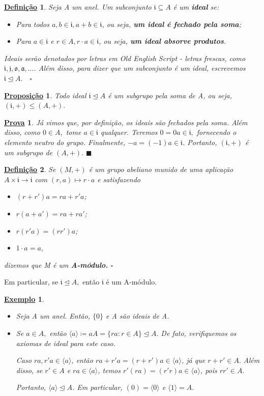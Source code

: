 \documentclass{article}
\newtheorem*{def*}{\underline{Defini\c c\~ao}}
\newtheorem*{prop*}{\underline{Proposi\c c\~ao}}
\newtheorem{example}{\underline{Exemplo}}
\newtheorem*{proof*}{\underline{Prova}}
\renewcommand\qedsymbol{$\blacksquare$}
\begin{document}
\begin{def*}
  Seja A um anel. Um subconjunto \(\mathfrak{i}\subseteq{A}\) é um \textbf{ideal} se:
  \begin{itemize}
    \item[1)] Para todos \(a, b\in \mathfrak{i}, a + b\in \mathfrak{i}\), ou seja, \textbf{um ideal é fechado pela soma};
    \item[2)] Para \(a\in \mathfrak{i}\) e \(r\in A, r \cdot a\in \mathfrak{i}\), ou seja, \textbf{um ideal absorve produtos}.
  \end{itemize}
  Ideais serão denotados por letras em \textit{Old English Script} - letras frescas, como \(\mathfrak{i}, \mathfrak{j}, \mathfrak{o}, \mathfrak{a}, \dotsc\).
  Além disso, para dizer que um subconjunto é um ideal, escrevemos \(\mathfrak{i} \trianglelefteq{A}.\quad\square\)
\end{def*}
\begin{prop*}
  Todo ideal \(\mathfrak{i}\trianglelefteq{A}\) é um subgrupo pela soma de A, ou seja, \((\mathfrak{i}, +)\leq (A, +).\)
\end{prop*}
\begin{proof*}
  Já vimos que, por definição, os ideais são fechados pela soma. Além disso, como \(0\in A,\) 
  tome \(a\in \mathfrak{i}\) qualquer. Teremos \(0 = 0a\in \mathfrak{i},\) fornecendo o elemento neutro do grupo.
  Finalmente, \(-a = (-1)a\in \mathfrak{i}\). Portanto, \((\mathfrak{i}, +)\) é um subgrupo de \((A, +).\) \qedsymbol
\end{proof*}
\begin{def*}
  Se \((M, +)\) é um grupo abeliano munido de uma aplicação \(A\times \mathfrak{i}\longrightarrow \mathfrak{i}\) com \((r, a)\mapsto r \cdot a\)
  e satisfazendo
  \begin{itemize}
    \item \((r + r')a = ra + r'a\);
    \item \(r(a + a') = ra + ra'\);
    \item \(r(r'a) = (rr')a\);
    \item \(1 \cdot a = a,\)
  \end{itemize}
  dizemos que M é um \textbf{A-módulo.} \(\square\)
\end{def*}
Em particular, se \(\mathfrak{i} \trianglelefteq{A},\) então \(\mathfrak{i}\) é um A-módulo.
\begin{example}
  \begin{itemize}
    \item[i)] Seja A um anel. Então, \(\{0\}\) e A são ideais de A. 
    \item[ii)] Se \(a\in A,\) então \(\langle a \rangle\coloneqq aA = \{ra: r\in A\}\trianglelefteq{A}.\) De fato,
      verifiquemos os axiomas de ideal para este caso.

      Caso \(ra, r'a\in \langle a \rangle\), então \(ra + r'a = (r+r')a\in \langle a \rangle\), já que \(r + r'\in A.\)
      Além disso, se \(r'\in A\) e \(ra\in \langle a \rangle\), temos \(r'(ra) = (r'r)a\in \langle a \rangle\), pois \(rr'\in A.\)

      Portanto, \(\langle a \rangle \trianglelefteq{A}\). Em particular, \((0) = \langle 0 \rangle\) e \(\langle 1 \rangle = A.\)
  \end{itemize}
\end{example}
\end{document}
